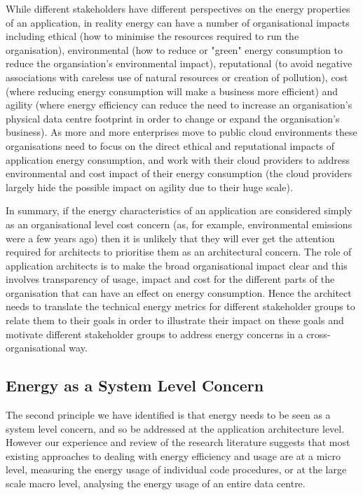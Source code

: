 While different stakeholders have different perspectives on the energy properties of an application, in reality energy can have a number of organisational impacts including ethical (how to minimise the resources required to run the organisation), environmental (how to reduce or "green" energy consumption to reduce the organsiation's environmental impact), reputational (to avoid negative associations with careless use of natural resources or creation of pollution), cost (where reducing energy consumption will make a business more efficient) and agility (where energy efficiency can reduce the need to increase an organisation's physical data centre footprint in order to change or expand the organisation's business).  As more and more enterprises move to public cloud environments \cite{idc2016-cloudreport} these organisations need to focus on the direct ethical and reputational impacts of application energy consumption, and work with their cloud providers to address environmental and cost impact of their energy consumption (the cloud providers largely hide the possible impact on agility due to their huge scale). 

In summary, if the energy characteristics of an application are considered simply as an organisational level cost concern (as, for example, environmental emissions were a few years ago) then it is unlikely that they will ever get the attention required for architects to prioritise them as an architectural concern.  The role of application architects is to make the broad organisational impact clear and this involves transparency of usage, impact and cost for the different parts of the organisation that can have an effect on energy consumption.  Hence the architect needs to translate the technical energy metrics for different stakeholder groups to relate them to their goals in order to illustrate their impact on these goals and motivate different stakeholder groups to address energy concerns in a cross-organisational way. 

\subsection{Energy as a System Level Concern}

The second principle we have identified is that energy needs to be seen as a system level concern, and so be addressed at the application architecture level.  However our experience and review of the research literature suggests that most existing approaches to dealing with energy efficiency and usage are at a micro level, measuring the energy usage of individual code procedures, or at the large scale macro level, analysing the energy usage of an entire data centre.  

